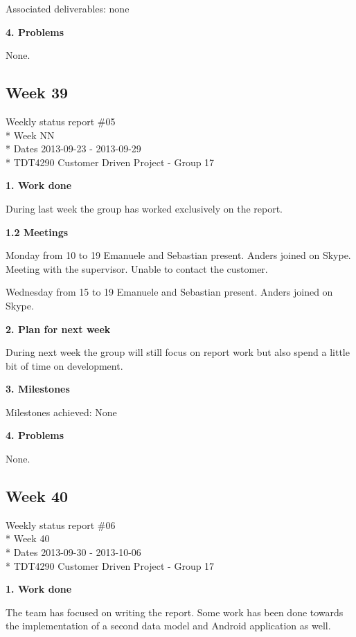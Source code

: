 Associated deliverables: none


\textbf{4. Problems}

None.


\newpage
\subsection{Week 39}

\begin{center}
Weekly status report \#05\\*
Week NN \\*
Dates 2013-09-23 - 2013-09-29 \\*
TDT4290 Customer Driven Project - Group 17
\end{center}

\textbf{1. Work done}

During last week the group has worked exclusively on the report.

\textbf{1.2 Meetings}

Monday from 10 to 19
Emanuele and Sebastian present. Anders joined on Skype.
Meeting with the supervisor. Unable to contact the customer.

Wednesday from 15 to 19
Emanuele and Sebastian present. Anders joined on Skype.


\textbf{2. Plan for next week}

During next week the group will still focus on report work but also spend a little bit of time on development.

\textbf{3. Milestones}

Milestones achieved: None

\textbf{4. Problems}

None.

\newpage
\subsection{Week 40}

\begin{center}
Weekly status report \#06\\*
Week 40 \\*
Dates 2013-09-30 - 2013-10-06 \\*
TDT4290 Customer Driven Project - Group 17
\end{center}

\textbf{1. Work done}

The team has focused on writing the report. Some work has been done towards
the implementation of a second data model and Android application as well.

